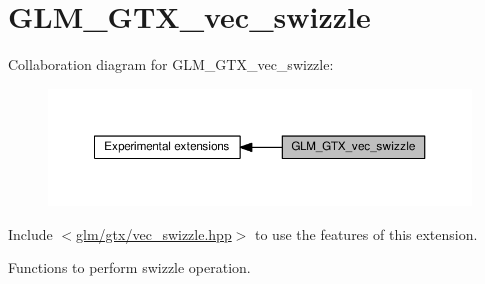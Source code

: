 \hypertarget{group__gtx__vec__swizzle}{}\section{G\+L\+M\+\_\+\+G\+T\+X\+\_\+vec\+\_\+swizzle}
\label{group__gtx__vec__swizzle}
Collaboration diagram for G\+L\+M\+\_\+\+G\+T\+X\+\_\+vec\+\_\+swizzle\+:
\nopagebreak
\begin{figure}[H]
\begin{center}
\leavevmode
\includegraphics[width=350pt]{df/d32/group__gtx__vec__swizzle}
\end{center}
\end{figure}
Include $<$\hyperlink{vec__swizzle_8hpp}{glm/gtx/vec\+\_\+swizzle.\+hpp}$>$ to use the features of this extension.

Functions to perform swizzle operation. 